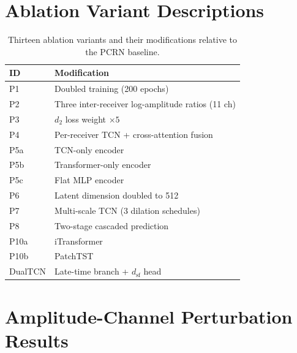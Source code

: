 \documentclass[journal]{IEEEtran}
\begin{document}
\section{Ablation Variant Descriptions}
\label{sec:supp_variants}

\begin{table}[t]
  \centering
  \footnotesize
  \caption{Thirteen ablation variants and their modifications
  relative to the PCRN baseline.}
  \label{tab:supp_experiments}
  \setlength{\tabcolsep}{2pt}
  \begin{tabular}{lp{4.5cm}}
    \toprule
    ID & Modification \\
    \midrule
    P1   & Doubled training (200 epochs) \\
    P2   & Three inter-receiver log-amplitude ratios (11 ch) \\
    P3   & $d_2$ loss weight $\times 5$ \\
    P4   & Per-receiver TCN + cross-attention fusion \\
    P5a  & TCN-only encoder \\
    P5b  & Transformer-only encoder \\
    P5c  & Flat MLP encoder \\
    P6   & Latent dimension doubled to 512 \\
    P7   & Multi-scale TCN (3 dilation schedules) \\
    P8   & Two-stage cascaded prediction \\
    P10a & iTransformer \\
    P10b & PatchTST \\
    DualTCN & Late-time branch + $d_\mathrm{sf}$ head \\
    \bottomrule
  \end{tabular}
\end{table}


\section{Amplitude-Channel Perturbation Results}
\label{sec:supp_amp}
\end{document}
